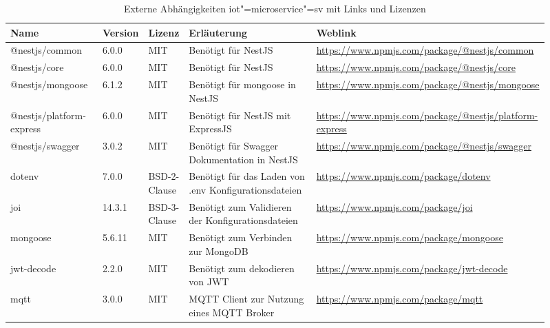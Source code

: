 \begin{landscape}
\begin{table}[htb]
	\caption{Externe Abhängigkeiten iot"=microservice"=sv mit Links und Lizenzen}
	\begin{tabular}{|p{0.18\linewidth}|p{0.06\linewidth}|p{0.06\linewidth}|p{0.28\linewidth}|p{0.33\linewidth}|}
		\hline
		Name & Version & Lizenz & Erläuterung & Weblink \\ \hline
		@nestjs/common & 6.0.0 & MIT & Benötigt für NestJS & \small\url{https://www.npmjs.com/package/@nestjs/common} \\ \hline
		@nestjs/core & 6.0.0 & MIT & Benötigt für NestJS & \small\url{https://www.npmjs.com/package/@nestjs/core} \\ \hline
		@nestjs/mongoose & 6.1.2 & MIT & Benötigt für mongoose in NestJS & \small\url{https://www.npmjs.com/package/@nestjs/mongoose} \\ \hline
		@nestjs/platform-express & 6.0.0 & MIT & Benötigt für NestJS mit ExpressJS & \small\url{https://www.npmjs.com/package/@nestjs/platform-express} \\ \hline
		@nestjs/swagger & 3.0.2 & MIT & Benötigt für Swagger Dokumentation in NestJS & \small\url{https://www.npmjs.com/package/@nestjs/swagger} \\ \hline
		dotenv & 7.0.0 & BSD-2-Clause & Benötigt für das Laden von .env Konfigurationsdateien & \small\url{https://www.npmjs.com/package/dotenv} \\ \hline
		joi & 14.3.1 & BSD-3-Clause & Benötigt zum Validieren der Konfigurationsdateien & \small\url{https://www.npmjs.com/package/joi} \\ \hline
		mongoose & 5.6.11 & MIT & Benötigt zum Verbinden zur MongoDB & \small\url{https://www.npmjs.com/package/mongoose} \\ \hline
		jwt-decode & 2.2.0 & MIT & Benötigt zum dekodieren von JWT & \small\url{https://www.npmjs.com/package/jwt-decode} \\ \hline
		mqtt & 3.0.0 & MIT & MQTT Client zur Nutzung eines MQTT Broker & \small\url{https://www.npmjs.com/package/mqtt} \\ \hline
	\end{tabular}
	\label{tbl:dependenciesMicroSV}
\end{table}


\end{landscape}
